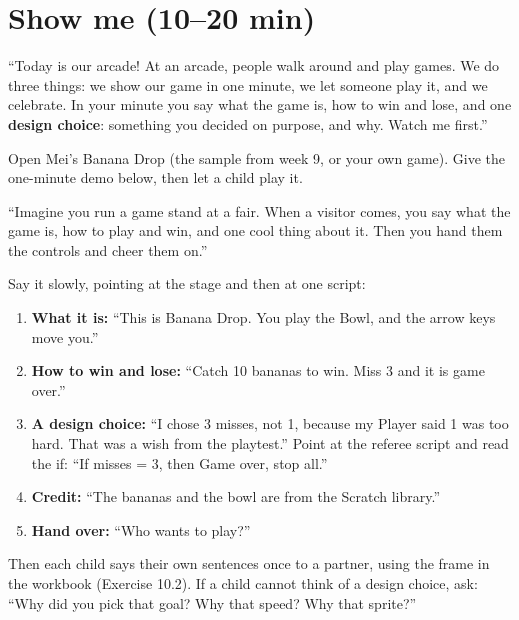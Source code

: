 \section{Show me (10--20 min)}
\begin{teacherscript}
\enquote{Today is our arcade! At an arcade, people walk around and play games. We do three things: we show our game in one minute, we let someone play it, and we celebrate. In your minute you say what the game is, how to win and lose, and one \textbf{design choice}: something you decided on purpose, and why. Watch me first.}

Open Mei's Banana Drop (the sample from week 9, or your own game). Give the one-minute demo below, then let a child play it.
\end{teacherscript}

\begin{analogy}
\enquote{Imagine you run a game stand at a fair. When a visitor comes, you say what the game is, how to play and win, and one cool thing about it. Then you hand them the controls and cheer them on.}
\end{analogy}

\begin{workedexample}
Say it slowly, pointing at the stage and then at one script:
\begin{enumerate}[leftmargin=1.4em,itemsep=1pt]
  \item \textbf{What it is:} \enquote{This is Banana Drop. You play the Bowl, and the arrow keys move you.}
  \item \textbf{How to win and lose:} \enquote{Catch 10 bananas to win. Miss 3 and it is game over.}
  \item \textbf{A design choice:} \enquote{I chose 3 misses, not 1, because my Player said 1 was too hard. That was a wish from the playtest.} Point at the referee script and read the if: \enquote{If misses = 3, then Game over, stop all.}
  \item \textbf{Credit:} \enquote{The bananas and the bowl are from the Scratch library.}
  \item \textbf{Hand over:} \enquote{Who wants to play?}
\end{enumerate}
\begin{center}
\begin{scratch}[scale=0.85]
\end{scratch}
\end{center}
Then each child says their own sentences once to a partner, using the frame in the workbook (Exercise 10.2). If a child cannot think of a design choice, ask: \enquote{Why did you pick that goal? Why that speed? Why that sprite?}
\end{workedexample}

